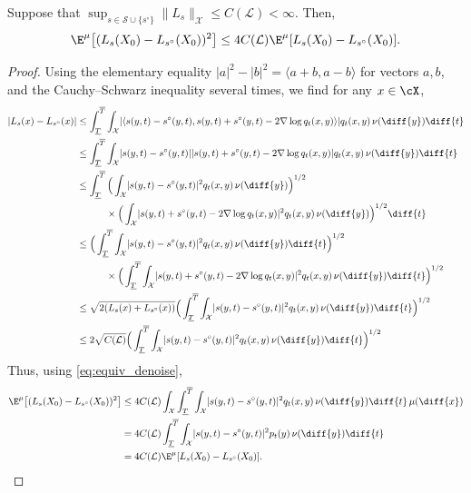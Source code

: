 \documentclass[a4paper, 11pt, headings = small, abstract]{scrartcl}
\begin{document}
\begin{lemma} 
Suppose that $\sup_{s \in \mathcal{S} \cup \{s^\circ\}} \lVert L_{s} \rVert_{\mathcal{X}} \leq C(\mathcal{L}) < \infty$. Then, 
\[\E^\mu\big[(L_s(X_0) - L_{s^\circ}(X_0))^2\big] \leq 4C(\mathcal{L}) \E^\mu[L_s(X_0) - L_{s^\circ}(X_0)].\]
\end{lemma}
\begin{proof} 
Using the elementary equality $\lvert a \rvert^2 - \lvert b \rvert^2 = \langle a+b,a-b\rangle$ for vectors $a,b$, and the Cauchy--Schwarz inequality several times, we find for any $x \in \cX$,
\begin{align*} 
\lvert L_s(x) - L_{s^\circ}(x)\rvert &\leq \int_{\underline{T}}^{\overline{T}} \int_{\mathcal{X}} \lvert \langle s(y,t) - s^\circ(y,t), s(y,t) + s^\circ(y,t) - 2 \nabla \log q_t(x,y)\rangle \rvert q_{t}(x,y) \,\nu(\diff{y}) \diff{t}\\ 
&\leq \int_{\underline{T}}^{\overline{T}} \int_{\mathcal{X}} \lvert s(y,t) - s^\circ(y,t) \rvert \lvert s(y,t) + s^\circ(y,t) - 2 \nabla \log q_t(x,y)\rvert  q_{t}(x,y) \,\nu(\diff{y}) \diff{t}\\ 
&\leq \int_{\underline{T}}^{\overline{T}} \Big(\int_{\mathcal{X}} \lvert s(y,t) - s^\circ(y,t) \rvert^2 q_t(x,y)\,\nu(\diff{y})\Big)^{1/2} \\
&\qquad \quad \times\Big(\int_{\mathcal{X}} \lvert s(y,t) + s^\circ(y,t) - 2 \nabla \log q_t(x,y)\rvert^2  q_{t}(x,y) \,\nu(\diff{y})\Big)^{1/2} \diff{t} \\ 
&\leq \Big(\int_{\underline{T}}^{\overline{T}} \int_{\mathcal{X}} \lvert s(y,t) - s^\circ(y,t) \rvert^2 q_t(x,y)\,\nu(\diff{y}) \diff{t}\Big)^{1/2} \\ 
& \qquad\quad\times\Big(\int_{\underline{T}}^{\overline{T}} \int_{\mathcal{X}} \lvert s(y,t) + s^\circ(y,t) - 2 \nabla \log q_t(x,y)\rvert^2  q_{t}(x,y) \,\nu(\diff{y}) \diff{t} \Big)^{1/2} \\
&\leq \sqrt{2(L_s(x) + L_{s^\circ}(x))} \Big(\int_{\underline{T}}^{\overline{T}} \int_{\mathcal{X}} \lvert s(y,t) - s^\circ(y,t) \rvert^2 q_t(x,y)\,\nu(\diff{y}) \diff{t}\Big)^{1/2}\\
&\leq 2\sqrt{C(\mathcal{L})} \Big(\int_{\underline{T}}^{\overline{T}} \int_{\mathcal{X}} \lvert s(y,t) - s^\circ(y,t) \rvert^2 q_t(x,y)\,\nu(\diff{y}) \diff{t}\Big)^{1/2} 
\end{align*}
Thus, using \eqref{eq:equiv_denoise},
\begin{align*} 
\E^\mu\big[(L_s(X_0) - L_{s^\circ}(X_0))^2\big] &\leq 4C(\mathcal{L}) \int_{\mathcal{X}}\int_{\underline{T}}^{\overline{T}} \int_{\mathcal{X}} \lvert s(y,t) - s^\circ(y,t) \rvert^2 q_t(x,y)\,\nu(\diff{y}) \diff{t} \,\mu(\diff{x}) \\
&= 4C(\mathcal{L}) \int_{\underline{T}}^{\overline{T}} \int_{\mathcal{X}} \lvert s(y,t) - s^\circ(y,t) \rvert^2 p_t(y) \,\nu(\diff{y}) \diff{t} \\ 
&= 4C(\mathcal{L}) \E^\mu[L_s(X_0) - L_{s^\circ}(X_0)].
\end{align*} 
\end{proof}
\end{document}
